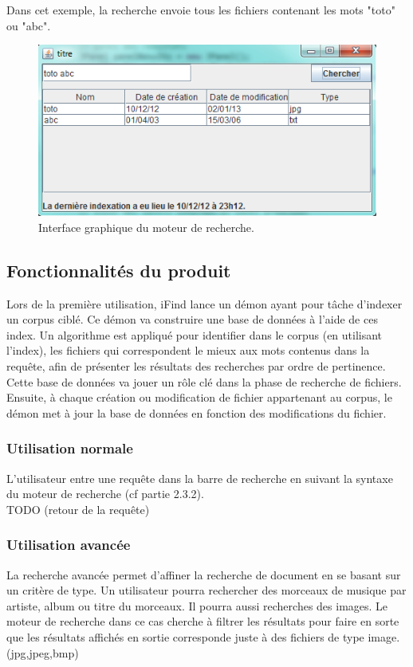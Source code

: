 Dans cet exemple, la recherche envoie tous les fichiers contenant les mots
"toto" ou "abc".

\begin{figure}[!h]
\includegraphics[scale=0.7]{rechercheSimple.png}
\caption{Interface graphique du moteur de recherche.}
\end{figure}

\subsection{Fonctionnalités du produit}
Lors de la première utilisation, iFind lance un démon ayant pour tâche d’indexer
un corpus ciblé. 
Ce démon va construire une base de données à l’aide de ces index. Un algorithme
est appliqué pour identifier dans le corpus (en utilisant l'index), les fichiers
qui correspondent le mieux aux mots contenus dans la requête, afin de présenter
les résultats des recherches par ordre de pertinence. Cette base de données va
jouer un rôle clé dans la phase de recherche de fichiers.
Ensuite, à chaque création ou modification de fichier appartenant au corpus, le
démon met à jour la base de données en fonction des modifications du fichier.

\subsubsection{Utilisation normale}
L'utilisateur entre une requête dans la barre de recherche en suivant la syntaxe
du moteur de recherche (cf partie 2.3.2).\\
TODO (retour de la requête)


\subsubsection{Utilisation avancée}

La recherche avancée permet d'affiner la recherche de document en se basant sur un critère de type.
Un utilisateur pourra rechercher des morceaux de musique par artiste, album ou titre du morceaux.
Il pourra aussi recherches des images. Le moteur de recherche dans ce cas cherche à filtrer les résultats pour faire en sorte que
les résultats affichés en sortie corresponde juste à des fichiers de type image. (jpg,jpeg,bmp)

